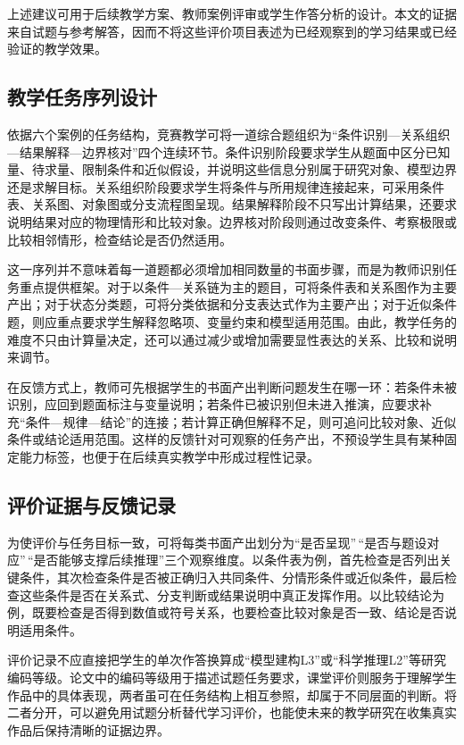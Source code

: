 \documentclass[
  12pt,
  a4paper]{ctexbook}
\begin{document}
上述建议可用于后续教学方案、教师案例评审或学生作答分析的设计。本文的证据来自试题与参考解答，因而不将这些评价项目表述为已经观察到的学习结果或已经验证的教学效果。

\subsection{教学任务序列设计}\label{ux6559ux5b66ux4efbux52a1ux5e8fux5217ux8bbeux8ba1}

依据六个案例的任务结构，竞赛教学可将一道综合题组织为``条件识别---关系组织---结果解释---边界核对''四个连续环节。条件识别阶段要求学生从题面中区分已知量、待求量、限制条件和近似假设，并说明这些信息分别属于研究对象、模型边界还是求解目标。关系组织阶段要求学生将条件与所用规律连接起来，可采用条件表、关系图、对象图或分支流程图呈现。结果解释阶段不只写出计算结果，还要求说明结果对应的物理情形和比较对象。边界核对阶段则通过改变条件、考察极限或比较相邻情形，检查结论是否仍然适用。

这一序列并不意味着每一道题都必须增加相同数量的书面步骤，而是为教师识别任务重点提供框架。对于以条件---关系链为主的题目，可将条件表和关系图作为主要产出；对于状态分类题，可将分类依据和分支表达式作为主要产出；对于近似条件题，则应重点要求学生解释忽略项、变量约束和模型适用范围。由此，教学任务的难度不只由计算量决定，还可以通过减少或增加需要显性表达的关系、比较和说明来调节。

在反馈方式上，教师可先根据学生的书面产出判断问题发生在哪一环：若条件未被识别，应回到题面标注与变量说明；若条件已被识别但未进入推演，应要求补充``条件---规律---结论''的连接；若计算正确但解释不足，则可追问比较对象、近似条件或结论适用范围。这样的反馈针对可观察的任务产出，不预设学生具有某种固定能力标签，也便于在后续真实教学中形成过程性记录。

\subsection{评价证据与反馈记录}\label{ux8bc4ux4ef7ux8bc1ux636eux4e0eux53cdux9988ux8bb0ux5f55}

为使评价与任务目标一致，可将每类书面产出划分为``是否呈现''\,``是否与题设对应''\,``是否能够支撑后续推理''三个观察维度。以条件表为例，首先检查是否列出关键条件，其次检查条件是否被正确归入共同条件、分情形条件或近似条件，最后检查这些条件是否在关系式、分支判断或结果说明中真正发挥作用。以比较结论为例，既要检查是否得到数值或符号关系，也要检查比较对象是否一致、结论是否说明适用条件。

评价记录不应直接把学生的单次作答换算成``模型建构L3''或``科学推理L2''等研究编码等级。论文中的编码等级用于描述试题任务要求，课堂评价则服务于理解学生作品中的具体表现，两者虽可在任务结构上相互参照，却属于不同层面的判断。将二者分开，可以避免用试题分析替代学习评价，也能使未来的教学研究在收集真实作品后保持清晰的证据边界。
\end{document}

